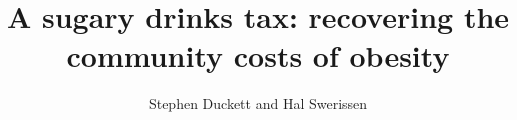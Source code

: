 \documentclass[embargoed]{grattan}
\title{A sugary drinks tax: recovering the community costs of obesity}
\author{Stephen Duckett and Hal Swerissen}
\begin{document}
\null
\end{document}
